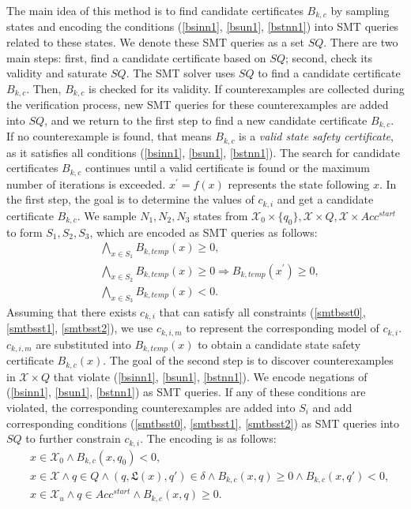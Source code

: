 \documentclass[acmlarge]{acmart}
\begin{document}
The main idea of this method is to find candidate certificates $B_{k, c}$ by sampling states and encoding the conditions (\ref{bsinn1}, \ref{bsun1}, \ref{bstnn1}) into SMT queries related to these states.
We denote these SMT queries as a set $SQ$.
There are two main steps: first, find a candidate certificate based on $SQ$; second, check its validity and saturate $SQ$. The SMT solver uses $SQ$ to find a candidate certificate $B_{k, c}$.
Then, $B_{k, c}$ is checked for its validity.
If counterexamples are collected during the verification process, new SMT queries for these counterexamples are added into $SQ$,
and we return to the first step to find a new candidate certificate $B_{k, c}$.
If no counterexample is found, that means $B_{k,c}$ is a \emph{valid state safety certificate}, as it satisfies all conditions (\ref{bsinn1}, \ref{bsun1}, \ref{bstnn1}).
The search for candidate certificates $B_{k, c}$ continues until a valid certificate is found or the maximum number of iterations is exceeded.
$x^{\prime} = f(x)$ represents the state following $x$.
In the first step, the goal is to determine the values of $c_{k,i}$ and get a candidate certificate $B_{k,c}$. We sample $N_1, N_2, N_3$ states from $\mathcal{X}_0 \times \{q_0\}, \mathcal{X} \times Q, \mathcal{X} \times Acc^{start}$ to form $S_1, S_2, S_3$, which are encoded as SMT queries as follows:
\begin{align}
  &\bigwedge_{x \in S_1} B_{k, temp}(x) \geq 0, \label{smtbsst0}\\
  &\bigwedge_{x \in S_2} B_{k, temp}(x) \geq 0 \Rightarrow B_{k, temp}(x^{\prime}) \geq 0, \label{smtbsst1}\\
  &\bigwedge_{x \in S_3} B_{k, temp}(x) < 0. \label{smtbsst2}
\end{align}
Assuming that there exists $c_{k, i}$ that can satisfy all constraints (\ref{smtbsst0}, \ref{smtbsst1}, \ref{smtbsst2}),
we use $c_{k,i,m}$ to represent the corresponding model of $c_{k,i}$.
$c_{k, i, m}$ are substituted into $B_{k, temp}(x)$ to obtain a candidate state safety certificate $B_{k, c}(x)$. The goal of the second step is to discover counterexamples in $\mathcal{X} \times Q$ that violate (\ref{bsinn1}, \ref{bsun1}, \ref{bstnn1}). We encode negations of (\ref{bsinn1}, \ref{bsun1}, \ref{bstnn1}) as SMT queries. If any of these conditions are violated, the corresponding counterexamples are added into $S_i$ and add corresponding conditions (\ref{smtbsst0}, \ref{smtbsst1}, \ref{smtbsst2}) as SMT queries into $SQ$ to further constrain $c_{k, i}$. The encoding is as follows:
\begin{align}
&x \in \mathcal{X}_0 \land B_{k, c}(x, q_0) < 0, \label{smtbssc0} \\
&x \in \mathcal{X} \land q \in Q \land (q, \mathfrak{L}(x), q') \in \delta \land B_{k, c}(x, q) \geq 0 \land B_{k, c}(x, q') < 0, \label{smtbssc1} \\
&x \in \mathcal{X}_u \land q \in Acc^{start} \land  B_{k, c}(x, q) \geq 0. \label{smtbssc2}
\end{align}
\end{document}
